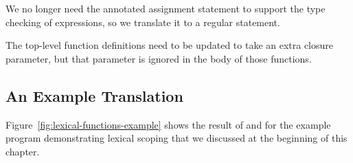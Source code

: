 \documentclass[7x10]{TimesAPriori_MIT}%
\numberwithin{theorem}{chapter}
\numberwithin{definition}{chapter}
\numberwithin{equation}{chapter}
\begin{document}
We no longer need the annotated assignment statement 
to support the type checking of  expressions, so we
translate it to a regular  statement.

The top-level function definitions need to be updated to take an extra
closure parameter, but that parameter is ignored in the body of those
functions.

\subsection{An Example Translation}
\label{sec:example-lambda}

Figure~\ref{fig:lexical-functions-example} shows the result of
 and  for the example
program demonstrating lexical scoping that we discussed at the
beginning of this chapter.
\end{document}
